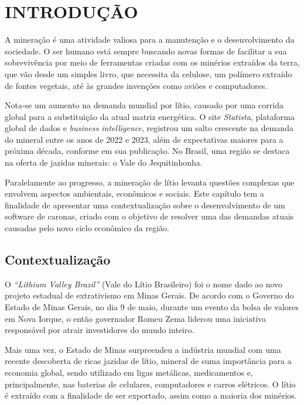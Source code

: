 \chapter{INTRODUÇÃO}

A mineração é uma atividade valiosa para a manutenção e o desenvolvimento da sociedade. O ser humano está sempre buscando novas formas de facilitar a sua sobrevivência por meio de ferramentas criadas com os minérios extraídos da terra, que vão desde um simples livro, que necessita da celulose, um polímero extraído de fontes vegetais, até às grandes invenções como aviões e computadores.

Nota-se um aumento na demanda mundial por lítio, causado por uma corrida global para a substituição da atual matriz energética. O site \textit{Statista}, plataforma global de dados e \textit{business intelligence}, registrou um salto crescente na demanda do mineral entre os anos de 2022 e 2023, além de expectativas maiores para a próxima década, conforme  em sua publicação. No Brasil, uma região se destaca na oferta de jazidas minerais: o Vale do Jequitinhonha.

Paralelamente ao progresso, a mineração de lítio levanta questões complexas que envolvem aspectos ambientais, econômicos e sociais. Este capítulo tem a finalidade de apresentar uma contextualização sobre o desenvolvimento de um software de caronas, criado com o objetivo de resolver uma das demandas atuais causadas pelo novo ciclo econômico da região.


\section{Contextualização}

O \textit{“Lithium Valley Brazil”} (Vale do Lítio Brasileiro) foi o nome dado ao novo projeto estadual de extrativismo em Minas Gerais. De acordo com o Governo do Estado de Minas Gerais, no dia 9 de maio, durante um evento da bolsa de valores em Nova Iorque, o então governador Romeu Zema liderou uma iniciativa responsável por atrair investidores do mundo inteiro. 

Mais uma vez, o Estado de Minas surpreendeu a indústria mundial com uma recente descoberta de ricas jazidas de lítio, mineral de suma importância para a economia global, sendo utilizado em ligas metálicas, medicamentos e, principalmente, nas baterias de celulares, computadores e carros elétricos. O lítio é extraído com a finalidade de ser exportado, assim como a maioria dos minérios.

